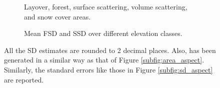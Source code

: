 \documentclass[review]{elsarticle}
\numberwithin{equation}{section}
\numberwithin{figure}{section}
\numberwithin{table}{section}
\begin{document}
\afterpage{\FloatBarrier}
\begin{figure}[!htbp]
    \centering
    \begin{subfigure}[t]{\textwidth}
        \caption{Layover, forest, surface scattering, volume scattering, and snow cover areas.}
        \label{subfig:area_elevation}
    \end{subfigure}
    \begin{subfigure}[t]{\textwidth}
        \caption{Mean FSD and SSD over different elevation classes.}
        \label{subfig:sd_elevation}
    \end{subfigure}
    \caption{All the SD estimates are rounded to 2 decimal places. Also,  has been generated in a similar way as that of Figure \ref{subfig:area_aspect}. Similarly, the standard errors like those in Figure \ref{subfig:sd_aspect} are reported.}
    \label{fig:sa_elevation}
\end{figure}
\end{document}
